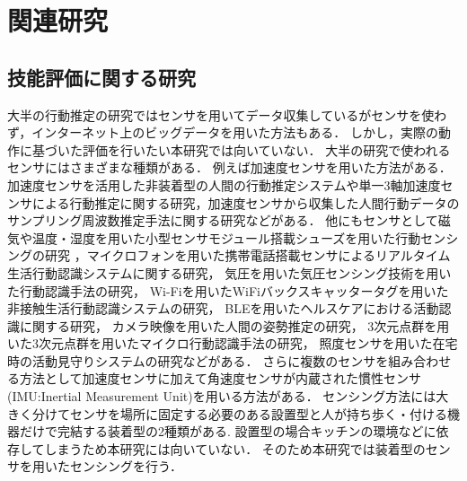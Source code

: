 \chapter{関連研究}
\section{技能評価に関する研究}
大半の行動推定の研究ではセンサを用いてデータ収集しているがセンサを使わず，インターネット上のビッグデータを用いた方法\cite{マイクロブログにおけるユーザの属性と習慣行動の推定に関する研究}もある．
しかし，実際の動作に基づいた評価を行いたい本研究では向いていない．
大半の研究で使われるセンサにはさまざまな種類がある．
例えば加速度センサを用いた方法がある．加速度センサを活用した非装着型の人間の行動推定システム\cite{加速度センサを活用した非装着型の人間の行動推定システム}や単一3軸加速度センサによる行動推定に関する研究\cite{単一3軸加速度センサによる行動推定}，加速度センサから収集した人間行動データのサンプリング周波数推定手法に関する研究\cite{加速度センサから収集した人間行動データのサンプリング周波数推定手法}などがある．
他にもセンサとして磁気や温度・湿度を用いた小型センサモジュール搭載シューズを用いた行動センシングの研究\cite{小型センサモジュール搭載シューズを用いた行動センシング}
，マイクロフォンを用いた携帯電話搭載センサによるリアルタイム生活行動認識システムに関する研究\cite{携帯電話搭載センサによるリアルタイム生活行動認識システム}，
気圧を用いた気圧センシング技術を用いた行動認識手法の研究\cite{気圧センシング技術を用いた行動認識手法}，
Wi-Fiを用いたWiFiバックスキャッタータグを用いた非接触生活行動認識システムの研究\cite{WiFiバックスキャッタータグを用いた非接触生活行動認識システムの提案}，
BLEを用いたヘルスケアにおける活動認識に関する研究\cite{Multimodal Wearable Sensing for Fine-Grained Activity Recognition in Healthcare}，
カメラ映像を用いた人間の姿勢推定の研究\cite{GLPose: Global-Local Representation Learning for Human Pose Estimation}，
3次元点群を用いた3次元点群を用いたマイクロ行動認識手法の研究\cite{3次元点群を用いたマイクロ行動認識手法の提案}，
照度センサを用いた在宅時の活動見守りシステムの研究\cite{照度センサを用いた在宅時の活動見守りシステム}などがある．
さらに複数のセンサを組み合わせる方法として加速度センサに加えて角速度センサが内蔵された慣性センサ(IMU:Inertial Measurement Unit)を用いる方法がある\cite{Human Action Recognition Method Based on Wearable Inertial Sensor}\cite{Real-Time Joint Axes Estimation of the Hip and Knee Joint during Gait Using Inertial Sensors}\cite{歩行者自律測位における行動センシング知識の利用}．
センシング方法には大きく分けてセンサを場所に固定する必要のある設置型と人が持ち歩く・付ける機器だけで完結する装着型の2種類がある.
設置型の場合キッチンの環境などに依存してしまうため本研究には向いていない．
そのため本研究では装着型のセンサを用いたセンシングを行う．

